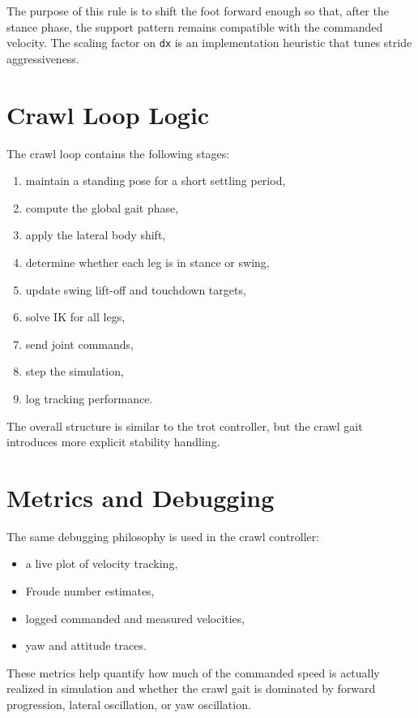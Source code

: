 \documentclass[11pt,a4paper]{report}
\begin{document}
The purpose of this rule is to shift the foot forward enough so that, after the stance phase, the support pattern remains compatible with the commanded velocity. The scaling factor on \texttt{dx} is an implementation heuristic that tunes stride aggressiveness.

\section{Crawl Loop Logic}

The crawl loop contains the following stages:
\begin{enumerate}
    \item maintain a standing pose for a short settling period,
    \item compute the global gait phase,
    \item apply the lateral body shift,
    \item determine whether each leg is in stance or swing,
    \item update swing lift-off and touchdown targets,
    \item solve IK for all legs,
    \item send joint commands,
    \item step the simulation,
    \item log tracking performance.
\end{enumerate}

The overall structure is similar to the trot controller, but the crawl gait introduces more explicit stability handling.

\section{Metrics and Debugging}

The same debugging philosophy is used in the crawl controller:
\begin{itemize}
    \item a live plot of velocity tracking,
    \item Froude number estimates,
    \item logged commanded and measured velocities,
    \item yaw and attitude traces.
\end{itemize}

These metrics help quantify how much of the commanded speed is actually realized in simulation and whether the crawl gait is dominated by forward progression, lateral oscillation, or yaw oscillation.
\end{document}
